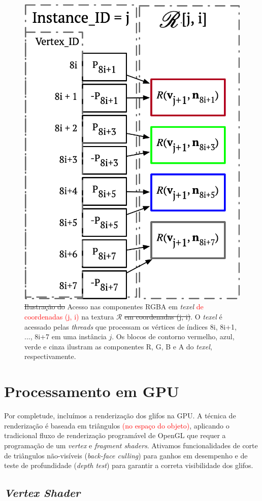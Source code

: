 \begin{figure}[ht]
    \centering
    \includegraphics[width=.45\linewidth, angle=0]{figs/Esquema_Glifo/texel_lookup_6.png}
    \caption{\sout{Ilustração do }Acesso nas componentes RGBA em \textit{texel} \textcolor{red}{de coordenadas (j, i)} na textura $\mathscr{R}$\sout{ em coordenadas (j, i)}. O \textit{texel} é acessado pelas \textit{threads} que processam os vértices de índices 8i, 8i+1, ..., 8i+7 em uma instância $j$. Os blocos de contorno vermelho, azul, verde e cinza ilustram as componentes R, G, B e A do \textit{texel}, respectivamente.}
    \label{fig::texelfetch}
\end{figure}
\section{Processamento em GPU}
\label{sec::processamento_GPU}

Por completude, incluímos a renderização dos glifos na GPU. A técnica de renderização é baseada em triângulos \textcolor{red}{(no espaço do objeto)}, aplicando o tradicional fluxo de renderização programável de OpenGL que requer a programação de um \textit{vertex} e \textit{fragment shaders}. Ativamos funcionalidades de corte de triângulos não-visíveis (\textit{back-face culling}) para ganhos em desempenho e de teste de profundidade (\textit{depth test}) para garantir a correta visibilidade dos glifos.


\subsection{\textit{Vertex Shader}}
\label{ssec::vertex_shader}

